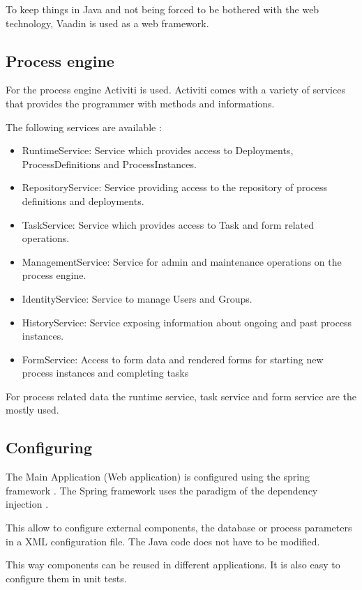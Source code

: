 \documentclass[paper=a4,twoside=false,BCOR=0mm,DIV=calc,fontsize=12pt]{scrartcl}
\begin{document}
To keep things in Java and not being forced to be bothered with the web technology, Vaadin \cite{Vaadin} is used as a web framework.


\subsection{Process engine}
For the process engine Activiti is used. Activiti comes with a variety of services that provides the programmer with methods and informations.

The following services are available \cite{activitijavadoc}:
\begin{itemize}
 \item RuntimeService: Service which provides access to Deployments, ProcessDefinitions and ProcessInstances. 
 \item RepositoryService: Service providing access to the repository of process definitions and deployments. 
 \item TaskService: Service which provides access to Task and form related operations. 
 \item ManagementService: Service for admin and maintenance operations on the process engine. 
 \item IdentityService: Service to manage Users and Groups. 
 \item HistoryService: Service exposing information about ongoing and past process instances. 
 \item FormService: Access to form data and rendered forms for starting new process instances and completing tasks
\end{itemize}

For process related data the runtime service, task service and form service are the mostly used.


\subsection{Configuring}
The Main Application (Web application) is configured using the spring framework \cite{spring}. The Spring framework uses the paradigm of the dependency injection \cite{dependencyInection}.

This allow to configure external components, the database or process parameters in a XML configuration file. The Java code does not have to be modified. 

This way components can be reused in different applications. It is also easy to configure them in unit tests.
\end{document}

